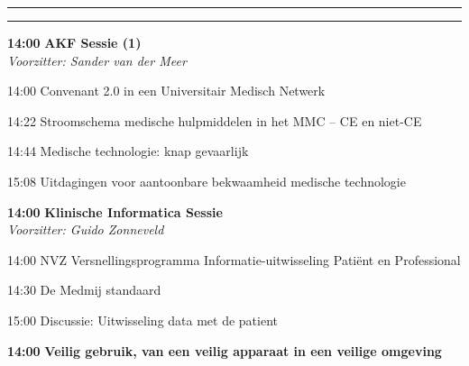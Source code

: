 \documentclass[a4paper,10pt]{report}
\begin{document}
\begin{multicols*}{3}
\vfill\strut

\columnbreak

\hrule \vspace{2mm}
\vspace{2mm}\hrule\strut

\begin{packed_enum}
\item[\textbf{14:00}] \textbf{AKF Sessie (1)}\\\textit{Voorzitter: Sander van der Meer}
\item[14:00] Convenant 2.0 in een Universitair Medisch Netwerk
\item[14:22] Stroomschema medische hulpmiddelen in het MMC -- CE en niet-CE
\item[14:44] Medische technologie: knap gevaarlijk
\item[15:08] Uitdagingen voor aantoonbare bekwaamheid medische technologie
\end{packed_enum} %

\vfill

\begin{packed_enum}
\item[\textbf{14:00}] \textbf{Klinische Informatica Sessie }\\\textit{Voorzitter: Guido Zonneveld}
\item[14:00] NVZ Versnellingsprogramma Informatie-uitwis\-seling Pa\-tiënt en Pro\-fessional 
\item[14:30] De Medmij standaard 
\item[15:00] Discussie: Uitwisseling data met de patient 
\end{packed_enum} %

\vfill

\begin{packed_enum}
\item[\textbf{14:00}] \textbf{Veilig gebruik, van een veilig apparaat in een veilige omgeving}\\
\end{packed_enum} %


\end{multicols*}
\end{document}
